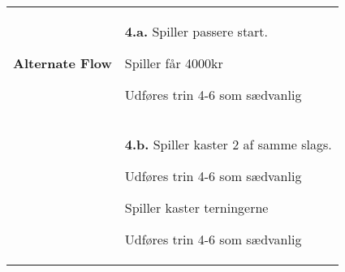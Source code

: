 \documentclass[class=article, crop=false]{standalone}
\begin{document}
\begin{table}[H]
\begin{tabularx}{\textwidth}{|l|X|}
    \textbf{Alternate Flow}   & \textbf{4.a.} Spiller passere start.
                                \begin{enumerate} \begin{tabenum}
                                        \item Spiller får 4000kr
                                        \item Udføres trin 4-6 som sædvanlig
                                    \end{tabenum} \end{enumerate}
                                 \\
                              & \textbf{4.b.} Spiller kaster 2 af samme slags.
            \begin{enumerate} \begin{tabenum}
                                  \item Udføres trin 4-6 som sædvanlig
                                  \item Spiller kaster terningerne
                                  \item Udføres trin 4-6 som sædvanlig
            \end{tabenum} \end{enumerate}
            \\





\end{tabularx}
\end{table}
\end{document}
